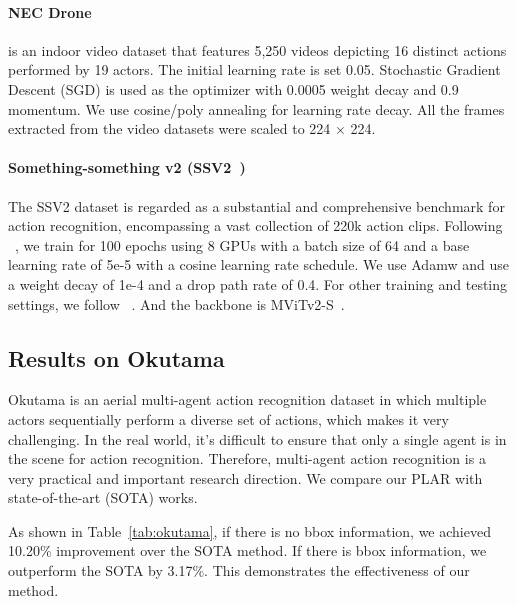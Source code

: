 \documentclass[letterpaper, 10 pt, conference]{ieeeconf}
\begin{document}
\paragraph{NEC Drone~\cite{choi2020unsupervised}} is an indoor video dataset that features 5,250 videos depicting 16 distinct actions performed by 19 actors. The initial learning rate is set 0.05. Stochastic Gradient Descent (SGD) is used as the optimizer with 0.0005 weight decay and 0.9 momentum. We use cosine/poly annealing for learning rate decay. All the frames extracted from the video datasets were scaled to 224 × 224. 








\paragraph{Something-something v2 (SSV2~\cite{goyal2017something})} 
The SSV2 dataset is regarded as a substantial and comprehensive benchmark for action recognition, encompassing a vast collection of 220k action clips. Following ~\cite{li2022mvitv2}, we train for 100 epochs using 8 GPUs with a batch size of 64 and a base learning rate of 5e-5 with a cosine learning rate schedule. We use Adamw and use a weight decay of 1e-4 and a drop path rate of 0.4. For other training and testing settings, we follow ~\cite{li2022mvitv2}. And the backbone is MViTv2-S~\cite{li2022mvitv2}.












\subsection{Results on Okutama}
Okutama is an aerial multi-agent action recognition dataset in which multiple actors sequentially perform a diverse set of actions, which makes it very challenging. In the real world, it's difficult to ensure that only a single agent is in the scene for action recognition. Therefore, multi-agent action recognition is a very practical and important research direction. We compare our PLAR with state-of-the-art (SOTA) works.

As shown in Table~\ref{tab:okutama}, if there is no bbox information, we achieved 10.20\% improvement over the SOTA method. If there is bbox information, we outperform the SOTA by 3.17\%. This demonstrates the effectiveness of our method.
\end{document}
